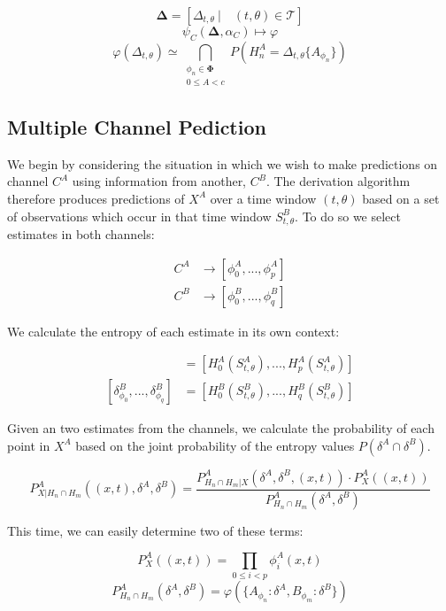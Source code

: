 \documentclass[10pt]{article}
\begin{document}
\[ \boldsymbol{\Delta} = [ \Delta_{t,\theta} \ | \quad (t,\theta) \in \mathcal{T} ] \]
\begin{equation} \psi_C( \boldsymbol{\Delta} , \alpha_C ) \mapsto \varphi \end{equation}
\[ \varphi( \Delta_{t,\theta} ) \simeq \bigcap_{\substack{ \phi_n \in \boldsymbol{\Phi} \\ 0 \le A < c }} P( H_n^A = \Delta_{t,\theta}\{A_{\phi_n} \} ) \]

\subsection{Multiple Channel Pediction}
We begin by considering the situation in which we wish to make predictions on channel \(C^A \) using information from another, \(C^B \).  The derivation algorithm therefore produces predictions of \(X^A \) over a time window \((t,\theta) \) based on a set of observations which occur in that time window \(S_{t,\theta}^B \).  To do so we select estimates in both channels:

\begin{align*}
C^A &\rightarrow [\phi_0^A,...,\phi_p^A] \\
C^B &\rightarrow [\phi_0^B,...,\phi_q^B]
\end{align*}

We calculate the entropy of each estimate in its own context:

\begin{align*}
[\delta_{\phi_0}^A,...,\delta_{\phi_p}^A ] &= [ H_0^A( S_{t,\theta}^A ),...,H_p^A( S_{t,\theta}^A ) ] \\
[\delta_{\phi_0}^B,...,\delta_{\phi_q}^B ] &= [ H_0^B( S_{t,\theta}^B ),...,H_q^B( S_{t,\theta}^B ) ]
\end{align*}

Given an two estimates from the channels, we calculate the probability of each point in \(X^A \) based on the joint probability of the entropy values \(P(\delta^A \cap \delta^B) \).

\begin{equation}
P_{X|H_n \cap H_m}^A \left( (x,t), \delta^A, \delta^B \right) =
\frac 
{ P_{H_n \cap H_m | X}^A \left( \delta^A, \delta^B,(x,t) \right) \cdot P_X^A \left( (x,t) \right) }
{ P_{H_n \cap H_m}^A \left( \delta^A, \delta^B \right) }
\end{equation}

This time, we can easily determine two of these terms:

\begin{equation} P_X^A \left( (x,t) \right) = \prod_{0 \le i < p} \phi_i^A(x,t) \end{equation}
\begin{equation} P_{H_n \cap H_m}^A \left( \delta^A, \delta^B \right) = \varphi \left( \{ A_{\phi_n}: \delta^A, B_{\phi_m}: \delta^B \} \right) \end{equation}
\end{document}
